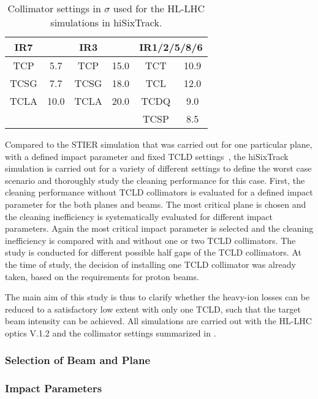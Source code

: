 \begin{table}[htbp]
\centering
\caption{Collimator settings in $\sigma$ used for the HL-LHC simulations in hiSixTrack.}
\label{tab:sets_hl}
\begin{tabular}{cccccc} 
\toprule
IR7    &       &   IR3   &          &    \multicolumn{2}{c}{IR1/2/5/8/6} \\ \midrule
TCP    &  5.7  &   TCP   &  15.0    &    TCT  &   10.9 \\ 
TCSG   &  7.7  &   TCSG  &  18.0    &    TCL  &   12.0 \\
TCLA   & 10.0  &   TCLA  &  20.0    &   TCDQ  &   9.0  \\ 
       &       &         &          &   TCSP  &   8.5  \\ \bottomrule
\end{tabular}
\end{table}

Compared to the STIER simulation that was carried out for one particular plane, with a defined impact parameter and fixed TCLD settings~\cite{phermes_ipac2015_1}, the hiSixTrack simulation is carried out for a variety of different settings to define the worst case scenario and thoroughly study the cleaning performance for this case. First, the cleaning performance without TCLD collimators is evaluated for a defined impact parameter for the both planes and beams. The most critical plane is chosen and the cleaning inefficiency is systematically evaluated for different impact parameters. Again the most critical impact parameter is selected and the cleaning inefficiency is compared with and without one or two TCLD collimators. The study is conducted for different possible half gaps of the TCLD collimators. At the time of study, the decision of installing one TCLD collimator was already taken, based on the requirements for proton beams. 

The main aim of this study is thus to clarify whether the heavy-ion losses can be reduced to a satisfactory low extent with only one TCLD, such that the target beam intensity can be achieved. All simulations are carried out with the HL-LHC optics V.1.2 and the collimator settings summarized in .

\subsubsection{Selection of Beam and Plane}


\subsubsection{Impact Parameters}



